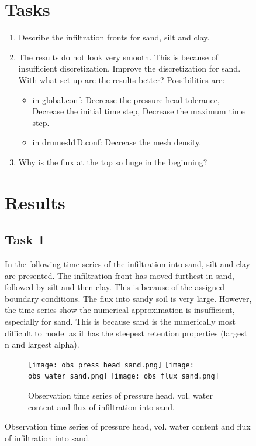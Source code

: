 \documentclass[
10pt, %
a4paper, %
oneside, %
headinclude,footinclude, %
BCOR5mm, %
]{scrartcl}
\begin{document}
\begin{figure}[!h]
\section*{Tasks}

\begin{enumerate}
\item Describe the infiltration fronts for sand, silt and clay.
\item The results do not look very smooth. This is because of insufficient discretization. Improve the discretization for sand. With what set-up are the results better? Possibilities are: 
\begin{itemize}
\item in global.conf: Decrease the pressure head tolerance, Decrease the initial time step, Decrease the maximum time step.
\item in drumesh1D.conf: Decrease the mesh density. 
\end{itemize}
\item Why is the flux at the top so huge in the beginning?
\end{enumerate}



\section*{Results}

\subsection*{Task 1}
In the following time series of the infiltration into sand, silt and clay are presented. The infiltration front has moved furthest in sand, followed by silt and then clay. This is because of the assigned boundary conditions. The flux into sandy soil is very large. However, the time series show the numerical approximation is insufficient, especially for sand. This is because sand is the numerically most difficult to model as it has the steepest retention properties (largest n and largest alpha).

\begin{figure}[!h]
\centering
\texttt{[image: obs\_press\_head\_sand.png]}
\texttt{[image: obs\_water\_sand.png]}
\texttt{[image: obs\_flux\_sand.png]}
\caption{Observation time series of pressure head, vol. water content and flux of infiltration into sand.}
\end{figure}


\end{figure}
\end{document}
